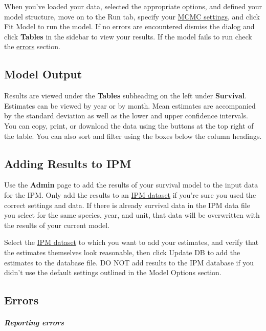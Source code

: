 \documentclass[
]{book}
\begin{document}
When you've loaded your data, selected the appropriate options, and defined your model structure, move on to the Run tab, specify your \protect\hyperlink{gl-mcmc}{MCMC settings}, and click {Fit Model} to run the model. If no errors are encountered dismiss the dialog and click \textbf{Tables} in the sidebar to view your results. If the model fails to run check the \protect\hyperlink{surv-errors}{errors} section.

\hypertarget{surv-output}{%
\subsection{Model Output}\label{surv-output}}

Results are viewed under the \textbf{Tables} subheading on the left under \textbf{Survival}. Estimates can be viewed by year or by month. Mean estimates are accompanied by the standard deviation as well as the lower and upper confidence intervals. You can copy, print, or download the data using the buttons at the top right of the table. You can also sort and filter using the boxes below the column headings.

\hypertarget{surv-admin}{%
\subsection{Adding Results to IPM}\label{surv-admin}}

Use the \textbf{Admin} page to add the results of your survival model to the input data for the IPM. Only add the results to an \protect\hyperlink{gl-ipm-db}{IPM dataset} if you're sure you used the correct settings and data. If there is already survival data in the IPM data file you select for the same species, year, and unit, that data will be overwritten with the results of your current model.

Select the \protect\hyperlink{gl-ipm-db}{IPM dataset} to which you want to add your estimates, and verify that the estimates themselves look reasonable, then click {Update DB} to add the estimates to the database file. DO NOT add results to the IPM database if you didn't use the default settings outlined in the \protect\hypertarget{surv-options}{}{Model Options} section.

\hypertarget{surv-errors}{%
\subsection{Errors}\label{surv-errors}}

\hypertarget{reporting-errors-1}{%
\subparagraph*{Reporting errors}\label{reporting-errors-1}}
\end{document}
